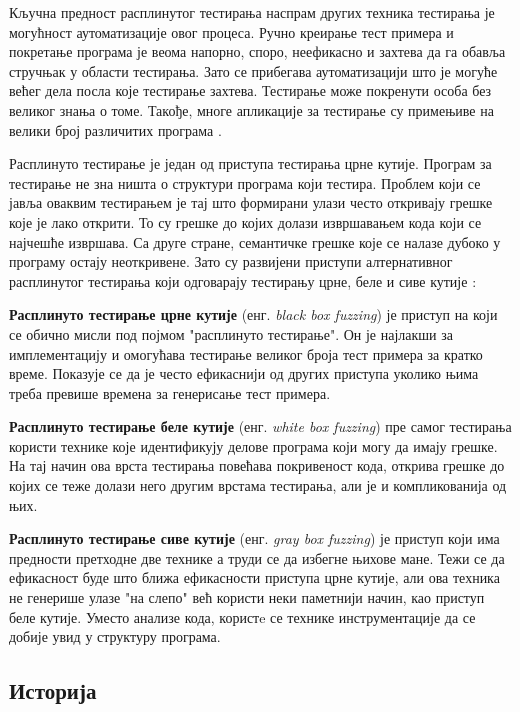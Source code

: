 \documentclass[12pt,oneside]{memoir}
\begin{document}
Кључна предност расплинутог тестирања наспрам других техника тестирања је могућност аутоматизације овог процеса. Ручно креирање тест примера и покретање програма је веома напорно, споро, неефикасно и захтева да га обавља стручњак у области тестирања. Зато се прибегава аутоматизацији што је могуће већег дела посла које тестирање захтева. Тестирање може покренути особа без великог знања о томе. Такође, многе апликације за тестирање су примењиве на велики број различитих програма \cite{fuzzingBrute, fuzzing}.

Расплинуто тестирање је један од приступа тестирања црне кутије. Програм за тестирање не зна ништа о структури програма који тестира. Проблем који се јавља оваквим тестирањем је тај што формирани улази често откривају грешке које је лако открити. То су грешке до којих долази извршавањем кода који се најчешће извршава. Са друге стране, семантичке грешке које се налазе дубоко у програму остају неоткривене. Зато су развијени приступи алтернативног расплинутог тестирања који одговарају тестирању црне, беле и сиве кутије \cite{fuzzing, grayBoxFuzzing, whiteBoxFuzzing}:
\begin{description}
\item\textbf{Расплинуто тестирање црне кутије} (енг. \textit{black box fuzzing}) је приступ на који се обично мисли под појмом "расплинуто тестирање". Он је најлакши за имплементацију и омогућава тестирање великог броја тест примера за кратко време. Показује се да је често ефикаснији од других приступа уколико њима треба превише времена за генерисање тест примера.
\item\textbf{Расплинуто тестирање беле кутије} (енг. \textit{white box fuzzing}) пре самог тестирања користи технике које идентификују делове програма који могу да имају грешке. На тај начин ова врста тестирања повећава покривеност кода, открива грешке до којих се теже долази него другим врстама тестирања, али је и компликованија од њих. 
\item\textbf{Расплинуто тестирање сиве кутије} (енг. \textit{gray box fuzzing}) је приступ који има предности претходне две технике а труди се да избегне њихове мане. Тежи се да ефикасност буде што ближа ефикасности приступа црне кутије, али ова техника не генерише улазе "на слепо" већ користи неки паметнији начин, као приступ беле кутије. Уместо анализе кода, користe се технике инструментације да се добије увид у структуру програма.
\end{description}

\subsection{Историја}
\label{subsec:history}
\end{document}
